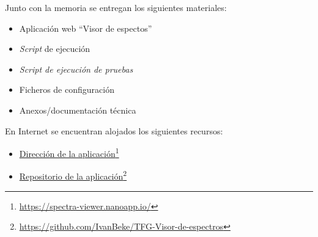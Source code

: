 Junto con la memoria se entregan los siguientes materiales:
\begin{itemize}
	\tightlist	
	\item Aplicación web ``Visor de espectos''
	\item \textit{Script} de ejecución
	\item \textit{Script de ejecución de pruebas}
	\item Ficheros de configuración
	\item Anexos/documentación técnica
\end{itemize}
En Internet se encuentran alojados los siguientes recursos:
\begin{itemize}
	\tightlist	
	\item \href{https://spectra-viewer.nanoapp.io/}{Dirección de la
		aplicación}\footnote{\url{https://spectra-viewer.nanoapp.io/}}
	\item \href{https://github.com/IvanBeke/TFG-Visor-de-espectros}{Repositorio de
		la
		aplicación}\footnote{\url{https://github.com/IvanBeke/TFG-Visor-de-espectros}}
\end{itemize}
